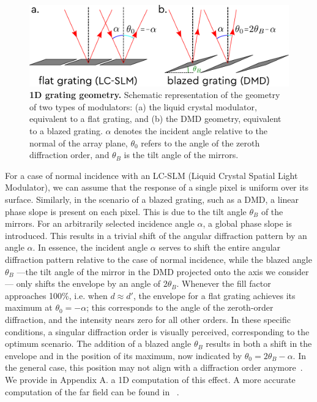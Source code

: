 \documentclass[12pt]{iopart}
\begin{document}
\begin{figure}
  \centering
  \includegraphics[width = \textwidth]{images/grating_geom.pdf}
  \caption{
    \textbf{1D grating geometry.}
    Schematic representation of the geometry of two types of modulators:
    (a) the liquid crystal modulator, equivalent to a flat grating,
    and (b) the DMD geometry, equivalent to a blazed grating.
    $\alpha$ denotes the incident angle relative to the normal of the array plane,
    $\theta_0$ refers to the angle of the zeroth diffraction order,
    and $\theta_B$ is the tilt angle of the mirrors.\\
  }
  \label{fig:grating_geom}
\end{figure}


For a case of normal incidence with an LC-SLM (Liquid Crystal Spatial Light Modulator),
we can assume that the response of a single pixel is uniform over its surface.
Similarly, in the scenario of a blazed grating,
such as a DMD, a linear phase slope is present on each pixel.
This is due to the tilt angle $\theta_B$ of the mirrors.
For an arbitrarily selected incidence angle $\alpha$,
a global phase slope is introduced.
This results in a trivial shift of the angular diffraction pattern by an angle $\alpha$.
In essence, the incident angle $\alpha$ serves to shift the entire angular diffraction pattern
relative to the case of normal incidence,
while the blazed angle $\theta_B$
—the tilt angle of the mirror in the DMD projected onto the axis we consider—
only shifts the envelope by an angle of $2\theta_B$.
Whenever the fill factor approaches 100\%,
i.e. when $d \approx d'$,
the envelope for a flat grating achieves its maximum at $\theta_0 = -\alpha$;
this corresponds to the angle of the zeroth-order diffraction,
and the intensity nears zero for all other orders.
In these specific conditions, a singular diffraction order is visually perceived, corresponding to the optimum scenario.
The addition of a blazed angle $\theta_B$ results in both
a shift in the envelope and in the position of its maximum,
now indicated by $\theta_0 = 2\theta_B - \alpha$.
In the general case,
this position may not align with a diffraction order anymore~\cite{Park2015properties}.
We provide in Appendix A.  a 1D computation of this effect.
A more accurate computation of the far field can be found  in ~\cite{Wang2023diffraction}.\\
\end{document}

